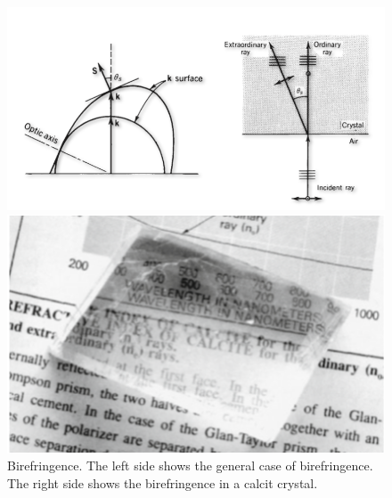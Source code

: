 \documentclass[
  a4paper,
]{book}
\begin{document}
\begin{figure}

\begin{minipage}{0.50\linewidth}

\includegraphics[width=1\linewidth,height=\textheight,keepaspectratio]{electromagnetic-waves/img/birefringence.png}

\end{minipage}%
%
\begin{minipage}{0.50\linewidth}

\includegraphics[width=0.8\linewidth,height=\textheight,keepaspectratio]{electromagnetic-waves/img/birefringence_exp.png}

\end{minipage}%

\caption{\label{fig-birefringence}Birefringence. The left side shows the
general case of birefringence. The right side shows the birefringence in
a calcit crystal.}

\end{figure}%
\end{document}
